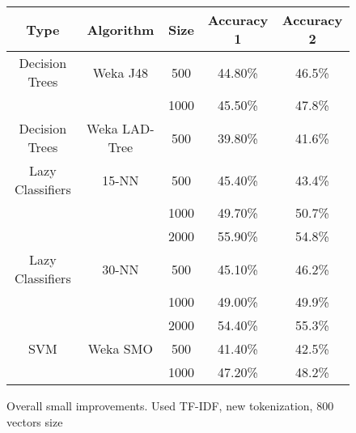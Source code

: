 \begin{figure}
\begin{center}
\begin{tabular}{|c|c|c|c|c|}
\hline
Type     &       Algorithm    & Size &   Accuracy 1 & Accuracy 2  \\ \hline
\hline
Decision Trees & Weka J48      &   500  &       44.80\%   &    46.5\% \\
                              &&  1000  &      45.50\%  &    47.8\%\\
Decision Trees & Weka LAD-Tree &   500  &      39.80\%  &    41.6\%\\

Lazy Classifiers & 15-NN &   500  &      45.40\% &    43.4\% \\
                              &&  1000  &      49.70\%  &    50.7\%\\
                              &&  2000  &      55.90\%  &    54.8\%\\
 
Lazy Classifiers & 30-NN  &   500  &      45.10\%  &    46.2\%\\
                              &&  1000  &      49.00\%  &    49.9\%\\
                              &&  2000  &      54.40\%  &    55.3\%\\


SVM & Weka SMO &   500  &      41.40\% &      42.5\% \\
                                     &&  1000  &      47.20\% &      48.2\% \\
\hline
\end{tabular}
\caption{\label{fig:performance} Overall small improvements. Used TF-IDF, new tokenization, 800 vectors size}
\end{center}
\end{figure}



